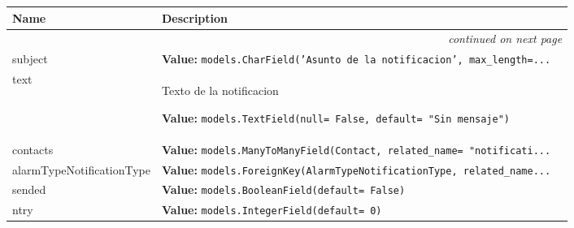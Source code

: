     \vspace{-1cm}
\hspace{\varindent}\begin{longtable}{|p{\varnamewidth}|p{\vardescrwidth}|l}
\cline{1-2}
\cline{1-2} \centering \textbf{Name} & \centering \textbf{Description}& \\
\cline{1-2}
\endhead\cline{1-2}\multicolumn{3}{r}{\small\textit{continued on next page}}\\\endfoot\cline{1-2}
\endlastfoot\raggedright s\-u\-b\-j\-e\-c\-t\- & \raggedright \textbf{Value:} 
{\tt models.CharField('Asunto de la notificacion', max\_length=\texttt{...}}&\\
\cline{1-2}
\raggedright t\-e\-x\-t\- & \raggedright Texto de la notificacion

\textbf{Value:} 
{\tt models.TextField(null= False, default= "Sin mensaje")}&\\
\cline{1-2}
\raggedright c\-o\-n\-t\-a\-c\-t\-s\- & \raggedright \textbf{Value:} 
{\tt models.ManyToManyField(Contact, related\_name= "notificati\texttt{...}}&\\
\cline{1-2}
\raggedright a\-l\-a\-r\-m\-T\-y\-p\-e\-N\-o\-t\-i\-f\-i\-c\-a\-t\-i\-o\-n\-T\-y\-p\-e\- & \raggedright \textbf{Value:} 
{\tt models.ForeignKey(AlarmTypeNotificationType, related\_name\texttt{...}}&\\
\cline{1-2}
\raggedright s\-e\-n\-d\-e\-d\- & \raggedright \textbf{Value:} 
{\tt models.BooleanField(default= False)}&\\
\cline{1-2}
\raggedright n\-t\-r\-y\- & \raggedright \textbf{Value:} 
{\tt models.IntegerField(default= 0)}&\\
\cline{1-2}
\end{longtable}

